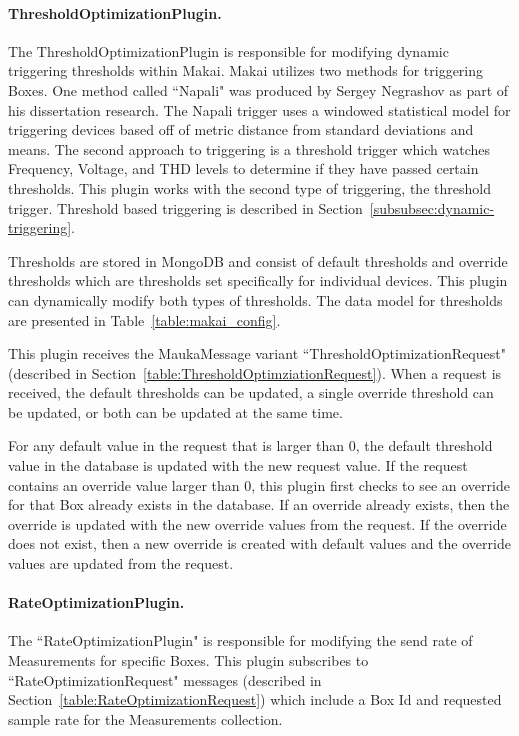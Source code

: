 \paragraph{ThresholdOptimizationPlugin.}\label{subsubsec:threshold-optimization-pugin}
The ThresholdOptimizationPlugin is responsible for modifying dynamic triggering thresholds within Makai. Makai utilizes two methods for triggering Boxes. One method called ``Napali" was produced by Sergey Negrashov as part of his dissertation research. The Napali trigger uses a windowed statistical model for triggering devices based off of metric distance from standard deviations and means. The second approach to triggering is a threshold trigger which watches Frequency, Voltage, and THD levels to determine if they have passed certain thresholds. This plugin works with the second type of triggering, the threshold trigger. Threshold based triggering is described in Section~\ref{subsubsec:dynamic-triggering}.

Thresholds are stored in MongoDB and consist of default thresholds and override thresholds which are thresholds set specifically for individual devices. This plugin can dynamically modify both types of thresholds. The data model for thresholds are presented in Table~\ref{table:makai_config}.

This plugin receives the MaukaMessage variant ``ThresholdOptimizationRequest" (described in Section~\ref{table:ThresholdOptimziationRequest}). When a request is received, the default thresholds can be updated, a single override threshold can be updated, or both can be updated at the same time.

For any default value in the request that is larger than 0, the default threshold value in the database is updated with the new request value. If the request contains an override value larger than 0, this plugin first checks to see an override for that Box already exists in the database. If an override already exists, then the override is updated with the new override values from the request. If the override does not exist, then a new override is created with default values and the override values are updated from the request.

\paragraph{RateOptimizationPlugin.}

The ``RateOptimizationPlugin" is responsible for modifying the send rate of Measurements for specific Boxes. This plugin subscribes to ``RateOptimizationRequest" messages (described in Section~\ref{table:RateOptimizationRequest}) which include a Box Id and requested sample rate for the Measurements collection.

